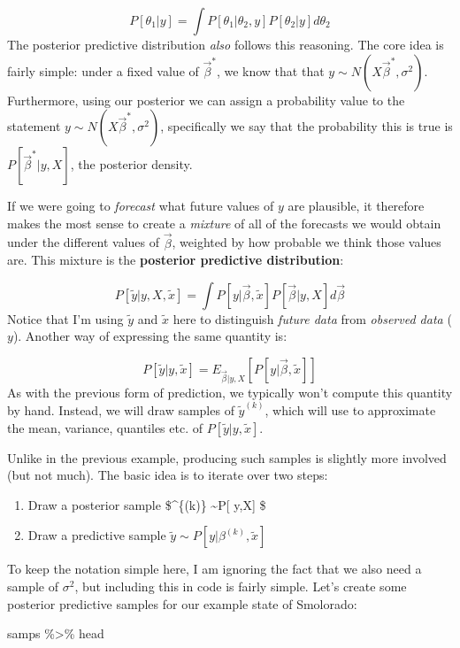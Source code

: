 \documentclass[
]{article}
\newenvironment{Shaded}{\begin{snugshade}}{\end{snugshade}}
\newcommand{\NormalTok}[1]{#1}
\newcommand{\SpecialCharTok}[1]{\textcolor[rgb]{0.00,0.00,0.00}{#1}}
\providecommand{\tightlist}{%
  \setlength{\itemsep}{0pt}\setlength{\parskip}{0pt}}
\begin{document}
\[
P[\theta_1 | y] = \int P[\theta_1 | \theta_2, y] P[\theta_2| y] d \theta_2
\] The posterior predictive distribution \emph{also} follows this
reasoning. The core idea is fairly simple: under a fixed value of
\(\vec \beta^*\), we know that that
\(y \sim N(X \vec \beta^*, \sigma^2)\). Furthermore, using our posterior
we can assign a probability value to the statement
\(y \sim N(X \vec \beta^*, \sigma^2)\), specifically we say that the
probability this is true is \(P[\vec \beta^* | y, X]\), the posterior
density.

If we were going to \emph{forecast} what future values of \(y\) are
plausible, it therefore makes the most sense to create a \emph{mixture}
of all of the forecasts we would obtain under the different values of
\(\vec \beta\), weighted by how probable we think those values are. This
mixture is the \textbf{posterior predictive distribution}:

\[
P[\tilde y | y, X, \tilde x] = \int P[y|\vec \beta, \tilde x] P[\vec \beta | y,X] d \vec \beta
\] Notice that I'm using \(\tilde y\) and \(\tilde x\) here to
distinguish \emph{future data} from \emph{observed data} (\(y\)).
Another way of expressing the same quantity is:

\[
P[\tilde y | y, \tilde x] = E_{\vec \beta | y, X} \left[ P[y|\vec \beta, \tilde x] \right ]
\] As with the previous form of prediction, we typically won't compute
this quantity by hand. Instead, we will draw samples of
\(\tilde y^{(k)}\), which will use to approximate the mean, variance,
quantiles etc. of \(P[\tilde y | y, \tilde x]\).

Unlike in the previous example, producing such samples is slightly more
involved (but not much). The basic idea is to iterate over two steps:

\begin{enumerate}
\def\labelenumi{\arabic{enumi}.}
\tightlist
\item
  Draw a posterior sample \$\beta\^{}\{(k)\}
  \sim P{[}\vec \beta \textbar{} y,X{]} \$
\item
  Draw a predictive sample \(\tilde y \sim P[y|\beta^{(k)}, \tilde x]\)
\end{enumerate}

To keep the notation simple here, I am ignoring the fact that we also
need a sample of \(\sigma^2\), but including this in code is fairly
simple. Let's create some posterior predictive samples for our example
state of Smolorado:

\begin{Shaded}
\begin{Highlighting}[]
\NormalTok{samps }\SpecialCharTok{\%\textgreater{}\%}\NormalTok{ head}
\end{Highlighting}
\end{Shaded}
\end{document}
